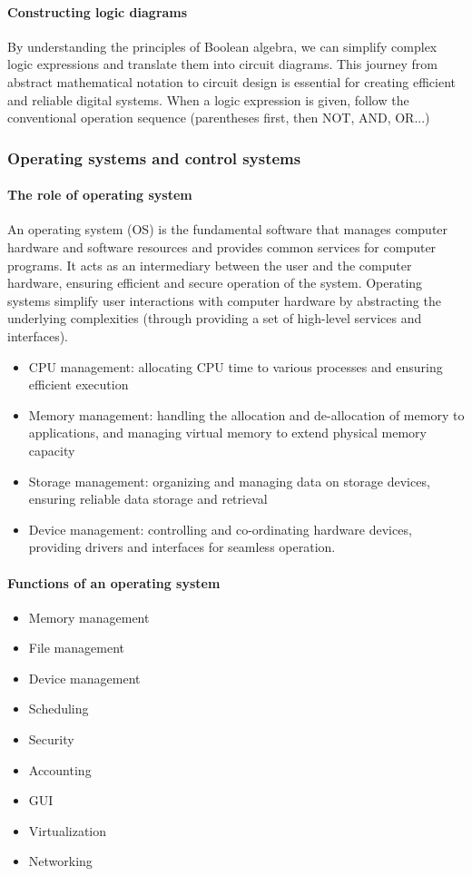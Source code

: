 \documentclass[a4paper,12pt]{article}
\begin{document}
\paragraph{Constructing logic diagrams}
By understanding the principles of Boolean algebra, we can simplify complex logic expressions and translate them into circuit diagrams. This journey from abstract mathematical notation 
to circuit design is essential for creating efficient and reliable digital systems. When a logic expression is given, follow the conventional operation sequence (parentheses first, then NOT, AND, OR...) 
\subsubsection{Operating systems and control systems}
\paragraph{The role of operating system}
An operating system (OS) is the fundamental software that manages computer hardware 
and software resources and provides common services for computer programs. It acts as an intermediary between the user and the computer hardware, ensuring efficient and secure operation of the system. Operating systems simplify user interactions with computer hardware by abstracting the underlying complexities (through providing a set of high-level services and interfaces).
\begin{itemize}
    \item CPU management: allocating CPU time to various processes and ensuring 
efficient execution 
	\item Memory management: handling the allocation and de-allocation of memory to 
applications, and managing virtual memory to extend physical memory capacity 
\item Storage management: organizing and managing data on storage devices, ensuring reliable data storage and retrieval 
\item Device management: controlling and co-ordinating hardware devices, providing drivers and interfaces for seamless operation. 
\end{itemize}
\paragraph{Functions of an operating system}
\begin{itemize}
    \item Memory management
    \item File management
    \item Device management
    \item Scheduling
    \item Security
    \item Accounting
    \item GUI
    \item Virtualization
    \item Networking
\end{itemize}
\end{document}

